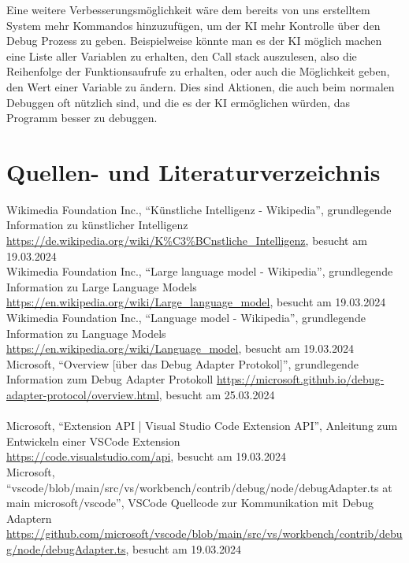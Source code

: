 \documentclass[a4paper,12pt,ngerman]{scrartcl}
\begin{document}
Eine weitere Verbesserungsmöglichkeit wäre dem bereits von uns erstelltem System mehr Kommandos hinzuzufügen, um der KI mehr Kontrolle über den Debug Prozess zu geben. Beispielweise könnte man es der KI möglich machen eine Liste aller Variablen zu erhalten, den Call stack auszulesen, also die Reihenfolge der Funktionsaufrufe zu erhalten, oder auch die Möglichkeit geben, den Wert einer Variable zu ändern. Dies sind Aktionen, die auch beim normalen Debuggen oft nützlich sind, und die es der KI ermöglichen würden, das Programm besser zu debuggen.

\section{Quellen- und Literaturverzeichnis}

Wikimedia Foundation Inc.,  ``Künstliche Intelligenz - Wikipedia'', grundlegende Information zu künstlicher Intelligenz\\
\url{https://de.wikipedia.org/wiki/K\%C3\%BCnstliche_Intelligenz}, besucht am 19.03.2024\\
Wikimedia Foundation Inc.,  ``Large language model - Wikipedia'', grundlegende Information zu Large Language Models\\
\url{https://en.wikipedia.org/wiki/Large_language_model}, besucht am 19.03.2024\\
Wikimedia Foundation Inc.,  ``Language model - Wikipedia'', grundlegende Information zu Language Models \\
\url{https://en.wikipedia.org/wiki/Language_model}, besucht am 19.03.2024\\
Microsoft, ``Overview [über das Debug Adapter Protokol]'', grundlegende Information zum Debug Adapter Protokoll
\url{https://microsoft.github.io/debug-adapter-protocol/overview.html}, besucht am 25.03.2024\\
\vspace{1em}\\
Microsoft, ``Extension API | Visual Studio Code Extension API'', Anleitung zum Entwickeln einer VSCode Extension\\
\url{https://code.visualstudio.com/api}, besucht am 19.03.2024\\
Microsoft, ``vscode/blob/main/src/vs/workbench/contrib/debug/node/debugAdapter.ts at main microsoft/vscode'', VSCode Quellcode zur Kommunikation mit Debug Adaptern\\
\url{https://github.com/microsoft/vscode/blob/main/src/vs/workbench/contrib/debug/node/debugAdapter.ts}, besucht am 19.03.2024
\end{document}
